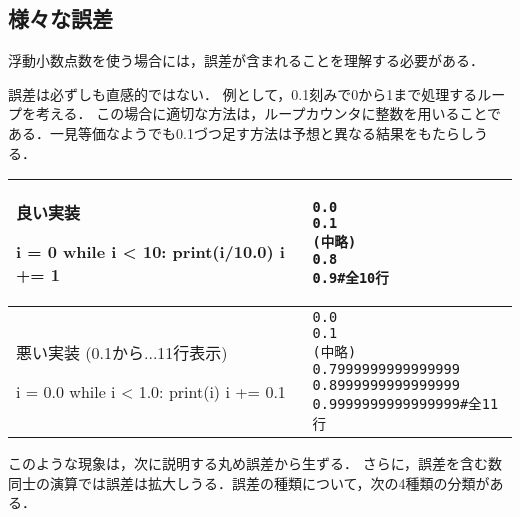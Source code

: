 \subsection{様々な誤差}
浮動小数点数を使う場合には，誤差が含まれることを理解する必要がある．

誤差は必ずしも直感的ではない．
例として，0.1刻みで0から1まで処理するループを考える．
この場合に適切な方法は，ループカウンタに整数を用いることである．一見等価なようでも0.1づつ足す方法は予想と異なる結果をもたらしうる．

\begin{center}
\begin{tabular}{ll}\hline
  \begin{minipage}{.4\linewidth}
良い実装
\begin{pybox}
i = 0
while i < 10:
  print(i/10.0)
  i += 1
\end{pybox}    
  \end{minipage}
  &
  \begin{minipage}{.5\linewidth}
\begin{alltt}
0.0
0.1
(中略)
0.8
0.9  \# 全10行    
\end{alltt}
  \end{minipage}
  \\\hline
  \begin{minipage}{.4\linewidth}
悪い実装
(0.1から...11行表示)
\begin{pybox}
i = 0.0
while i < 1.0:
  print(i)
  i += 0.1
\end{pybox}
  \end{minipage}
  &
  \begin{minipage}{.5\linewidth}
\begin{alltt}
0.0
0.1
(中略)
0.7999999999999999
0.8999999999999999
0.9999999999999999     # 全11行
\end{alltt}
  \end{minipage}
\\\hline\end{tabular}
\end{center}

このような現象は，次に説明する丸め誤差から生ずる．
さらに，誤差を含む数同士の演算では誤差は拡大しうる．誤差の種類について，次の4種類の分類がある．

